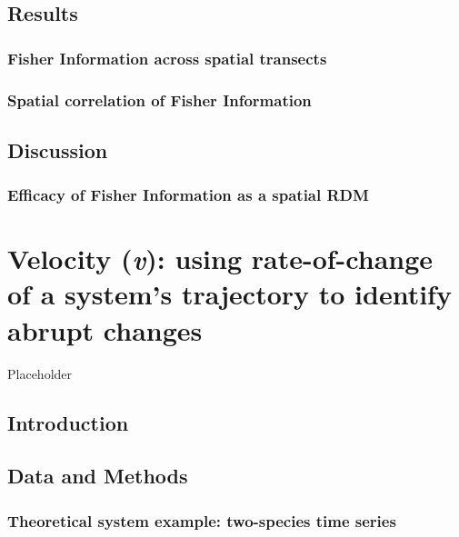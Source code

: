 \documentclass[12pt,twoside,openany]{reedthesis}
\begin{document}
\section{Results}\label{results-1}

\subsection{Fisher Information across spatial
transects}\label{fisher-information-across-spatial-transects}

\subsection{Spatial correlation of Fisher
Information}\label{spatial-correlation-of-fisher-information-1}

\section{Discussion}\label{discussion-1}

\subsection{Efficacy of Fisher Information as a spatial
RDM}\label{efficacy-of-fisher-information-as-a-spatial-rdm}

\chapter{\texorpdfstring{Velocity (\emph{v}): using rate-of-change of a
system's trajectory to identify abrupt
changes}{Velocity (v): using rate-of-change of a system's trajectory to identify abrupt changes}}\label{velocity}

Placeholder

\section{Introduction}\label{introduction-3}

\section{Data and Methods}\label{data-and-methods-1}

\subsection{Theoretical system example: two-species time
series}\label{theoretical-system-example-two-species-time-series}
\end{document}
